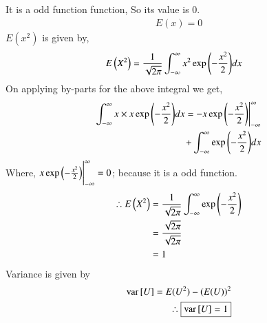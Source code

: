 \documentclass[journal,12pt,twocolumn]{IEEEtran}
\begin{document}
    It is a odd function function, So its value is 0.
    \begin{align}
        \boxed{E(x)=0}
    \end{align}
$E({x^2})$ is given by,
    \begin{align}
		&	E\left(X^2\right) = \frac{1}{\sqrt{2\pi}}\int_{-\infty}^{\infty}x^2\exp{\left(-\frac{x^2}{2}\right)}dx 
	\end{align}
On applying by-parts for the above integral we get,
    \begin{align}
        \int_{-\infty}^{\infty}x \times x \exp{\left(-\frac{x^2}{2}\right)}dx = -x\exp\left(-\frac{x^2}{2}\right)\Biggr|_{-\infty}^{\infty}& \\ +\int_{-\infty}^{\infty}\exp{\left(-\frac{x^2}{2}\right)} dx
    \end{align}		
Where, $x\exp\left(-\frac{x^2}{2}\right)\Biggr|_{-\infty}^{\infty} = 0$; because it is a odd function.
    \begin{align}
       \therefore E\left(X^2\right) &= \frac{1}{\sqrt{2\pi}}\int_{-\infty}^{\infty} \exp\left(-\frac{x^2}{2}\right) \\
                    &= \frac{\sqrt{2\pi}}{\sqrt{2\pi}} \\
                    &= 1
    \end{align}
Variance is given by
    \begin{align}
        \text{var}{}\left[U\right]=E(U^2)-(E(U))^2\\
        \therefore \boxed{\text{var}{}\left[U\right]=1}
    \end{align}


\end{document}
